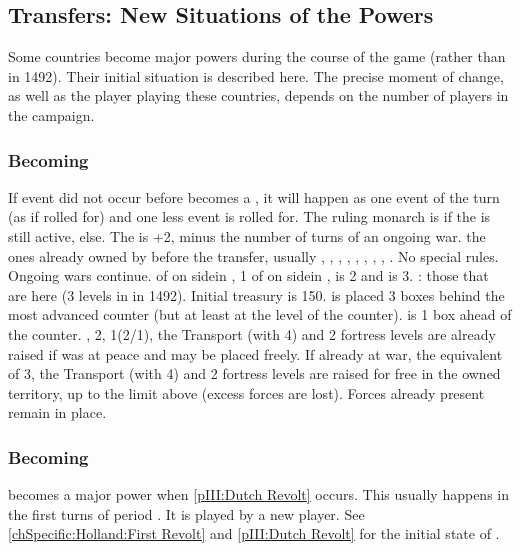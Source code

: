 \subsection{Transfers: New Situations of the Powers}
\aparag Some countries become major powers during the course of the game
(rather than in 1492). Their initial situation is described here.
\bparag The precise moment of change, as well as the player playing these
countries, depends on the number of players in the campaign.

\subsubsection{Becoming \paysmajeurSuede}
\aparag If event  did not occur before \SUE becomes a
\MAJ, it will happen as one event of the turn (as if rolled for) and one less
event is rolled for.
 The ruling monarch is  if the
 is still active,  else. The \STAB
is +2, minus the number of turns of an ongoing war.
 the ones already owned by \MIN \payssuede before the
transfer, usually \provinceSmaland, \provinceJamtland, \provinceGastrikland,
\provinceBergslagen, \provinceSvealand, \provinceFinland, \provinceTavastland,
\provinceNyland, \provinceKarelen.
 No special rules. Ongoing wars continue.
\MNU of  on side\faceplus in \provinceSvealand, 1 \MNU of
 on side\facemoins in \provinceJamtland, \FTI is 2 and \DTI is
3. \TradeFLEET: those that are here (3 levels in \seazoneBaltique in 1492).
\bparag Initial treasury is 150\ducats.
\aparag[Military]
\bparag {} is placed 3 boxes behind the most advanced
counter (but at least at the level of the  counter).  is 1 box ahead of the  counter.
\ARMY\faceplus, 2\LD, 1\FLEET\facemoins (2\NWD/1\NTD), the Transport
\FLEET\faceplus (with 4\NTD) and 2 fortress levels are already raised if
\payssuede was at peace and may be placed freely. If already at war, the
equivalent of 3\LD, the Transport \FLEET\faceplus (with 4\NTD) and 2 fortress
levels are raised for free in the owned territory, up to the limit above
(excess forces are lost). Forces already present remain in place.


\subsubsection{Becoming \paysmajeurHollande}
\aparag \HOL becomes a major power when \ref{pIII:Dutch Revolt} occurs. This
usually happens in the first turns of period .
\bparag It is played by a new player.
\aparag See \ref{chSpecific:Holland:First Revolt} and \ref{pIII:Dutch Revolt}
for the initial state of \paysmajeurHollande.


